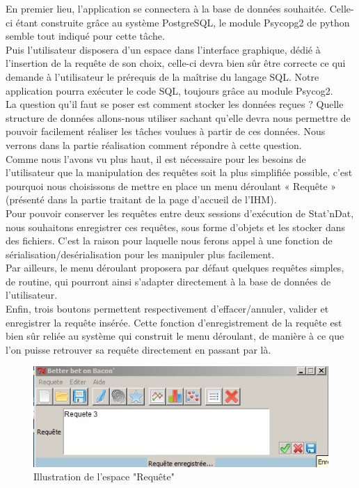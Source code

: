 \documentclass[a4paper,10pt]{report}
\begin{document}
En premier lieu, l'application se connectera à la base de données souhaitée. Celle-ci étant construite grâce au système PostgreSQL, le module Psycopg2 de python semble tout indiqué pour cette tâche.\\

Puis l'utilisateur disposera d'un espace dans l'interface graphique, dédié à l'insertion de la requête de son choix, celle-ci devra bien sûr être correcte ce qui demande à l’utilisateur le prérequis de la maîtrise du langage SQL.  Notre application pourra exécuter le code SQL, toujours grâce au module Psycog2.\\

La question qu’il faut se poser est comment stocker les données reçues ? Quelle structure de données allons-nous utiliser sachant qu’elle devra nous permettre de pouvoir facilement réaliser les tâches voulues à partir de ces données. Nous verrons dans la partie réalisation comment répondre à cette question.\\

Comme nous l’avons vu plus haut, il est nécessaire pour les besoins de l’utilisateur que la manipulation des requêtes soit la plus simplifiée possible, c’est pourquoi nous choisissons de mettre en place un menu déroulant « Requête » (présenté dans la partie traitant de la page d’accueil de l’IHM).\\

Pour pouvoir conserver les requêtes entre deux sessions d’exécution de Stat’nDat, nous souhaitons enregistrer ces requêtes, sous forme d’objets et les stocker dans des fichiers. C’est la raison pour laquelle nous ferons appel à une fonction de sérialisation/desérialisation pour les manipuler plus facilement. \\

Par ailleurs, le menu déroulant proposera par défaut quelques requêtes simples, de routine, qui pourront ainsi s’adapter directement à la base de données de l’utilisateur.\\

Enfin, trois boutons permettent respectivement d’effacer/annuler, valider et enregistrer la requête insérée. Cette fonction d’enregistrement de la requête est bien sûr reliée au système qui construit le menu déroulant, de manière à ce que l’on puisse retrouver sa requête directement en passant par là.


\begin{figure}[H]

\centering
\includegraphics[scale=0.6]{requ.jpg}
\caption{Illustration de l'espace "Requête"}

\end{figure}
\end{document}
